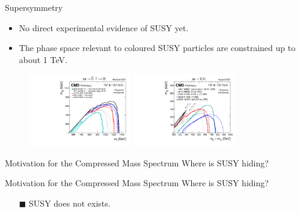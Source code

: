 \begin{frame}[fragile]{Supersymmetry}
  \begin{itemize}
    \item No direct experimental evidence of SUSY yet.
    \item The phase space relevant to coloured SUSY particles are constrained up to about 1 TeV.
  \end{itemize}
  
  \begin{figure}[htpb]
    \centering
    \includegraphics[width=0.4\textwidth]{fig/T2tt_limits_summary_cms.pdf}
    \includegraphics[width=0.4\textwidth]{fig/WZ_limits_summary_cms.pdf}
  \end{figure}
\end{frame}

\begin{frame}[fragile]{Motivation for the Compressed Mass Spectrum}
   Where is SUSY hiding?
\end{frame}


\begin{frame}[fragile]{Motivation for the Compressed Mass Spectrum}
   Where is SUSY hiding?
  \begin{itemize}
    \item[\(\blacksquare\)] SUSY does not exists.
  \end{itemize}
\end{frame}

